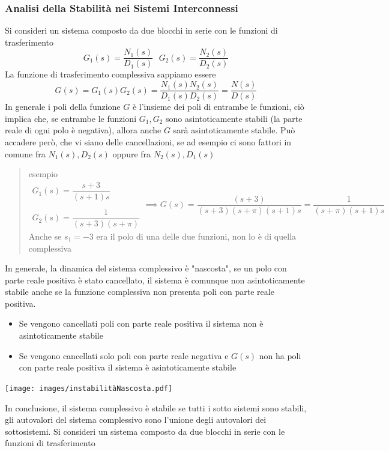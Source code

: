 \documentclass[10pt, letterpaper]{report}
\begin{document}
\subsubsection{Analisi della Stabilità nei Sistemi Interconnessi}
Si consideri un sistema composto da due blocchi in serie con le funzioni di trasferimento 
$$ G_1(s)=\frac{N_1(s)}{D_1(s)} \ \ \  G_2(s)=\frac{N_2(s)}{D_2(s)} $$
La funzione di trasferimento complessiva sappiamo essere 
$$ G(s)=G_1(s)G_2(s)=\frac{N_1(s)N_2(s)}{D_1(s)D_2(s)}=\frac{N(s)}{D(s)}$$
In generale
i poli della funzione $G$ è l'insieme dei poli di entrambe le funzioni, ciò implica che, se 
entrambe le funzioni $G_1,G_2$ sono asintoticamente stabili (la parte reale di ogni polo è 
negativa), allora anche $G$ sarà asintoticamente stabile.\acc 
Può accadere però, che vi siano delle cancellazioni, se ad esempio ci sono fattori in comune fra 
$N_1(s),D_2(s)$ oppure fra $N_2(s),D_1(s)$ \begin{quote}
    esempio $$ \begin{matrix}
        G_1(s)=\dfrac{s+3}{(s+1)s} \\ \\
        G_2(s)=\dfrac{1}{(s+3)(s+\pi)}
    \end{matrix}\implies G(s)=\frac{(s+3)}{(s+3)(s+\pi)(s+1)s}=\frac{1}{(s+\pi)(s+1)s}$$
    Anche se $s_1=-3$ era il polo di una delle due funzioni, non lo è di quella complessiva
\end{quote}
In generale, la dinamica del sistema complessivo è "nascosta", se un polo con parte reale positiva è stato 
cancellato, il sistema è comunque non asintoticamente stabile anche se la funzione complessiva non presenta poli con parte 
reale positiva.\begin{itemize}
    \item Se vengono cancellati poli con parte reale positiva il sistema 
    non è asintoticamente stabile 
    \item Se vengono cancellati solo poli con parte reale negativa e $G(s)$ non ha poli con parte 
    reale positiva il sistema è asintoticamente stabile
\end{itemize}\begin{center}
    \texttt{[image: images/instabilitàNascosta.pdf]}
\end{center}
In conclusione, il sistema complessivo è stabile se tutti i sotto sistemi sono stabili, gli autovalori del 
sistema complessivo sono l'unione degli autovalori dei sottosistemi.\acc 
Si consideri un sistema composto da due blocchi in serie con le funzioni di trasferimento 
\end{document}
